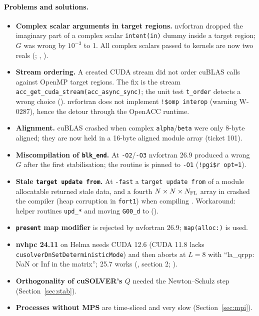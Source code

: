 \paragraph{Problems and solutions.}
\begin{itemize}
\item \textbf{Complex scalar arguments in target regions.} nvfortran dropped the imaginary part of a complex scalar \texttt{intent(in)} dummy inside a target region; $G$ was wrong by $10^{-3}$ to 1. All complex scalars passed to kernels are now two reals (; , ).
\item \textbf{Stream ordering.} A created CUDA stream did not order cuBLAS calls against OpenMP target regions. The fix is the stream \texttt{acc\_get\_cuda\_stream(acc\_async\_sync)}; the unit test \texttt{t\_order} detects a wrong choice (). nvfortran does not implement \texttt{!\$omp interop} (warning W-0287), hence the detour through the OpenACC runtime.
\item \textbf{Alignment.} cuBLAS crashed when complex \texttt{alpha}/\texttt{beta} were only 8-byte aligned; they are now held in a 16-byte aligned module array (ticket 101).
\item \textbf{Miscompilation of \texttt{blk\_end}.} At \texttt{-O2}/\texttt{-O3} nvfortran 26.9 produced a wrong $G$ after the first stabilisation; the routine is pinned to \texttt{-O1} (\texttt{!pgi\$r opt=1}).
\item \textbf{Stale \texttt{target update from}.} At \texttt{-fast} a \texttt{target update from} of a module allocatable returned stale data, and a fourth $N\times N\times N_{\rm FL}$ array in  crashed the compiler (heap corruption in \texttt{fort1}) when compiling . Workaround: helper routines \texttt{upd\_*} and moving \texttt{G00\_d} to  ().
\item \textbf{\texttt{present} map modifier} is rejected by nvfortran 26.9; \texttt{map(alloc:)} is used.
\item \textbf{nvhpc 24.11} on Helma needs CUDA 12.6 (CUDA 11.8 lacks \texttt{cusolverDnSetDeterministicMode}) and then aborts at $L=8$ with ``la\_qrpp: NaN or Inf in the matrix''; 25.7 works (, section 2; ).
\item \textbf{Orthogonality of cuSOLVER's $Q$} needed the Newton--Schulz step (Section~\ref{sec:stab}).
\item \textbf{Processes without MPS} are time-sliced and very slow (Section~\ref{sec:mpi}).
\end{itemize}

